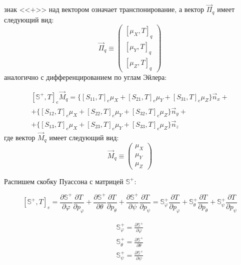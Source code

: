 знак <<$+$>> над вектором означает транспонирование, а вектор $\vec{\Pi}_q$ имеет следующий вид:
\[
\vec{\Pi}_q \equiv\left(\begin{matrix}
[\mu_X,T]_q \\
[\mu_Y,T]_q \\
[\mu_Z,T]_q 
\end{matrix} \right) 
\]
аналогично с дифференцированием по углам Эйлера:

\begin{equation*}
\begin{aligned}
  \left[\mathbb{S}^{+},T\right]_e \vec{M}_q = \bigg \{ [S_{11},T]_e \mu_X +  [S_{21},T]_e \mu_Y +  [S_{31},T]_e \mu_Z   \bigg  \} \vec{n}_x + \\
 + \bigg\{ [S_{12},T]_e \mu_X +  [S_{22},T]_e \mu_Y +  [S_{32},T]_e \mu_Z    \bigg\} \vec{n}_y + \\
 + \bigg\{ [S_{13},T]_e \mu_X +  [S_{23},T]_e \mu_Y +  [S_{33},T]_e \mu_Z   \bigg \} \vec{n}_z  
\end{aligned}
\end{equation*}
где вектор $\vec{M}_q$ имеет следующий вид:
\[
\vec{M}_q \equiv\left(\begin{matrix}
\mu_X \\
\mu_Y \\
\mu_Z
\end{matrix} \right) 
\]

Распишем скобку Пуассона с матрицей $\mathbb{S}^{+}$:

\begin{equation}
\label{eq:poisson_S}
[\mathbb{S}^{+},T]_e  = \frac{\partial\mathbb{S}^{+}}{\partial\varphi}\frac{\partial T}{\partial p_{\varphi}} +
\frac{\partial\mathbb{S}^{+}}{\partial\theta}\frac{\partial T}{\partial p_{\theta}} +
\frac{\partial\mathbb{S}^{+}}{\partial\psi}\frac{\partial T}{\partial p_{\psi}} = 
 \mathbb{S}^{+}_{\varphi}\frac{\partial T}{\partial p_{\varphi}} +
 \mathbb{S}^{+}_{\theta}\frac{\partial T}{\partial p_{\theta}} +
 \mathbb{S}^{+}_{\psi}\frac{\partial T}{\partial p_{\psi}}
\end{equation}

\begin{equation}
\label{eq:S_e}
\begin{aligned}
\mathbb{S}^{+}_{\varphi} =  \frac{\partial\mathbb{S}^{+}}{\partial\varphi}\\
\mathbb{S}^{+}_{\theta} =  \frac{\partial\mathbb{S}^{+}}{\partial\theta}\\
 \mathbb{S}^{+}_{\psi} =  \frac{\partial\mathbb{S}^{+}}{\partial\psi}
\end{aligned}
\end{equation}

